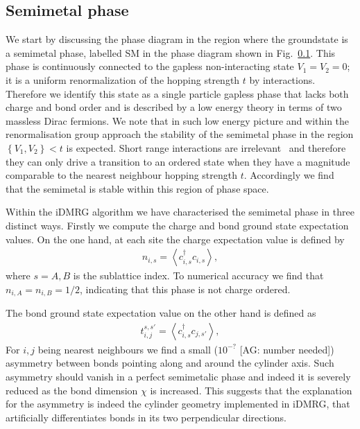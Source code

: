 \documentclass[aps,prx,10pt,twocolumn,floatfix,superscriptaddress,showpacs,numerical,footinbib]{revtex4-1}
\newcommand{\noteAG}[1]{{\color{blue} [AG: #1]}}
\begin{document}
%
\subsection{Semimetal phase}
%
We start by discussing the phase diagram in the region where 
the groundstate is a semimetal phase, labelled SM in the phase diagram shown in Fig.~\ref{}.
%
This phase is continuously connected to the gapless non-interacting state $V_{1}=V_{2}=0$; 
it is a uniform renormalization of the hopping strength $t$ by interactions.
%
Therefore we identify this state as a single particle gapless phase that lacks both charge and bond order and is described by a low energy theory in terms of two massless Dirac fermions.
%
We note that in such low energy picture and within the renormalisation group approach the stability of the semimetal phase in the region $\left\lbrace V_{1},V_{2}\right\rbrace < t$ is expected.
%
Short range interactions are irrelevant~\cite{Shankar?} and therefore they can only drive a transition to an ordered state when they have a magnitude comparable to the nearest neighbour hopping strength $t$.
%
Accordingly we find that the semimetal is stable within this region of phase space.

Within the iDMRG algorithm we have characterised the semimetal phase in three distinct ways.
%
Firstly we compute the charge and bond ground state expectation values.
%
On the one hand, at each site the charge expectation value is defined by 
%
\begin{eqnarray}
\label{eq:charge}
n_{i,s}=\left\langle c^{\dagger}_{i,s}c_{i,s}\right\rangle,  
\end{eqnarray}
%
where $s=A,B$ is the sublattice index.
%
To numerical accuracy we find that $n_{i,A}=n_{i,B}=1/2$, indicating that this phase is not charge ordered.
%

The bond ground state expectation value on the other hand is defined as
%
\begin{eqnarray}
\label{eq:charge}
t^{s,s'}_{i,j}=\left\langle c^{\dagger}_{i,s}c_{j,s'}\right\rangle,  
\end{eqnarray}
%
For $i,j$ being nearest neighbours we find a small ($10^{-?}$ \noteAG{number needed}) asymmetry
between bonds pointing along and around the cylinder axis.
%
Such asymmetry should vanish in a perfect semimetalic phase and indeed it is severely reduced as the bond dimension $\chi$ is increased.
% 
This suggests that the explanation for the asymmetry is indeed the cylinder geometry implemented in iDMRG, that artificially differentiates bonds in its two perpendicular directions.
%
\end{document}

